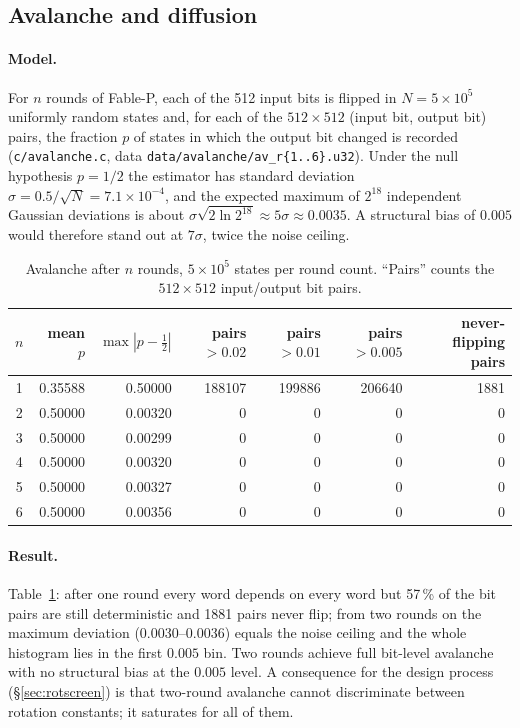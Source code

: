 \documentclass{iacrtrans}
\newcommand{\FableP}{\textsf{Fable-P}\xspace}
\begin{document}
\subsection{Avalanche and diffusion}
\label{sec:avalanche}
\paragraph{Model.} For $n$ rounds of \FableP, each of the 512 input bits is flipped in $N = 5\times10^5$ uniformly random states and, for each of the $512\times512$ (input bit, output bit) pairs, the fraction $p$ of states in which the output bit changed is recorded (\texttt{c/avalanche.c}, data \texttt{data/avalanche/av\_r\{1..6\}.u32}). Under the null hypothesis $p = 1/2$ the estimator has standard deviation $\sigma = 0.5/\sqrt{N} = 7.1\times10^{-4}$, and the expected maximum of $2^{18}$ independent Gaussian deviations is about $\sigma\sqrt{2\ln 2^{18}} \approx 5\sigma \approx 0.0035$. A structural bias of $0.005$ would therefore stand out at $7\sigma$, twice the noise ceiling.

\begin{table}[htb]
\centering
\caption{Avalanche after $n$ rounds, $5\times10^5$ states per round count. ``Pairs'' counts the $512\times512$ input/output bit pairs.}
\label{tab:avalanche}
\footnotesize
\begin{tabular}{crrrrrr}
\toprule
$n$ & mean $p$ & $\max|p-\tfrac12|$ & pairs $>0.02$ & pairs $>0.01$ & pairs $>0.005$ & never-flipping pairs\\
\midrule
1 & 0.35588 & 0.50000 & 188107 & 199886 & 206640 & 1881\\
2 & 0.50000 & 0.00320 & 0 & 0 & 0 & 0\\
3 & 0.50000 & 0.00299 & 0 & 0 & 0 & 0\\
4 & 0.50000 & 0.00320 & 0 & 0 & 0 & 0\\
5 & 0.50000 & 0.00327 & 0 & 0 & 0 & 0\\
6 & 0.50000 & 0.00356 & 0 & 0 & 0 & 0\\
\bottomrule
\end{tabular}
\end{table}

\paragraph{Result.} Table~\ref{tab:avalanche}: after one round every word depends on every word but 57\,\% of the bit pairs are still deterministic and 1881 pairs never flip; from two rounds on the maximum deviation ($0.0030$--$0.0036$) equals the noise ceiling and the whole histogram lies in the first $0.005$ bin. Two rounds achieve full bit-level avalanche with no structural bias at the $0.005$ level. A consequence for the design process (\S\ref{sec:rotscreen}) is that two-round avalanche cannot discriminate between rotation constants; it saturates for all of them.
\end{document}
